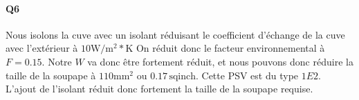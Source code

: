 \documentclass[a4paper,oneside,12pt]{article}
\begin{document}
\paragraph{Q6}
Nous isolons la cuve avec un isolant réduisant le coefficient d'échange de la cuve avec l'extérieur à 
$10 \si{\watt}/\si{\meter\squared}*\si{\kelvin}$
On réduit donc le facteur environnemental à $F = 0.15$. 
Notre $W$ va donc être fortement réduit, et nous pouvons donc réduire la taille de la soupape à 
$110\si{\milli\meter\squared}$ ou $0.17 \, \text{sqinch}$. Cette PSV est du type $1E2$. L'ajout de l'isolant réduit donc fortement la taille de
la soupape requise.
\end{document}
